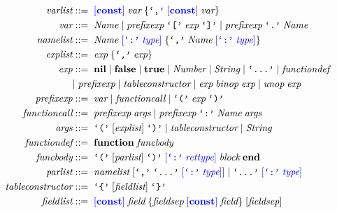 \begin{align*}
\textit{varlist} & ::= \; \textcolor{blue}{[\textbf{const}]} \; \textit{var} \;
  \{\texttt{`,'} \; \textcolor{blue}{[\textbf{const}]} \; \textit{var}\}\\
\textit{var} & ::= \; \textit{Name} \; | \;
  \textit{prefixexp} \; \texttt{`['} \; \textit{exp} \; \texttt{`]'} \; | \;
  \textit{prefixexp} \; \texttt{`.'} \; \textit{Name}\\
\textit{namelist} & ::= \; \textit{Name} \; \textcolor{blue}{[\texttt{`:'} \; \textit{type}]} \;
  \{\texttt{`,'} \; \textit{Name} \; \textcolor{blue}{[\texttt{`:'} \; \textit{type}]}\}\\
\textit{explist} & ::= \; \textit{exp} \; \{\texttt{`,'} \; \textit{exp}\}\\
\textit{exp} & ::= \; \textbf{nil} \; | \;
  \textbf{false} \; | \;
  \textbf{true} \; | \;
  \textit{Number} \; | \;
  \textit{String} \; | \;
  \texttt{`...'} \; | \;
  \textit{functiondef}\\
& | \; \textit{prefixexp} \; | \;
  \textit{tableconstructor} \; | \;
  \textit{exp} \; \textit{binop} \; \textit{exp} \; | \;
  \textit{unop} \; \textit{exp}\\
\textit{prefixexp} & ::= \; \textit{var} \; | \;
  \textit{functioncall} \; | \;
  \texttt{`('} \; \textit{exp} \; \texttt{`)'}\\
\textit{functioncall} & ::= \; \textit{prefixexp} \; \textit{args} \; | \;
  \textit{prefixexp} \; \texttt{`:'} \; \textit{Name} \; \textit{args}\\
\textit{args} & ::= \; \texttt{`('} \; [\textit{explist}] \; \texttt{`)'} \; | \;
  \textit{tableconstructor} \; | \;
  \textit{String}\\
\textit{functiondef} & ::= \; \textbf{function} \; \textit{funcbody}\\
\textit{funcbody} & ::= \; \texttt{`('} \; [\textit{parlist}] \; \texttt{`)'} \;
  \textcolor{blue}{[\texttt{`:'} \; \textit{rettype}]} \; \textit{block} \; \textbf{end}\\
\textit{parlist} & ::= \; \textit{namelist} \; [\texttt{`,'} \; \texttt{`...'} \;
  \textcolor{blue}{[\texttt{`:'} \; \textit{type}]}] \; | \;
  \texttt{`...'} \; \textcolor{blue}{[\texttt{`:'} \; \textit{type}]}\\
\textit{tableconstructor} & ::= \; \texttt{`\{'} \; [\textit{fieldlist}] \; \texttt{`\}'}\\
\textit{fieldlist} & ::= \; \textcolor{blue}{[\textbf{const}]} \; \textit{field} \;
  \{\textit{fieldsep} \; \textcolor{blue}{[\textbf{const}]} \; \textit{field}\} \; [\textit{fieldsep}]\\

\end{align*}
